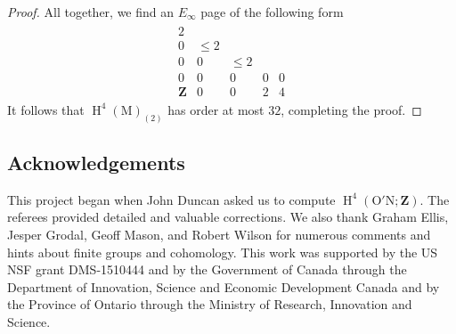 \documentclass[pdftex]{sigma}
\numberwithin{equation}{section}
\newcommand\bZ{\mathbf Z}
\newcommand\rM{\mathrm M}
\DeclareMathOperator\homology{H}
\renewcommand\H{\homology}
\newcommand\<\langle
\renewcommand\>\rangle
\begin{document}
\begin{proof}
 All together, we find an $E_\infty$ page of the following form
 \begin{gather*} \begin{array}{ccccc}
 2 \\
 0 & \leq 2 \\
 0 & 0 & \leq 2 \\
 0 & 0 & 0 & 0 & 0 \\
 \bZ & 0 & 0 & 2 & 4
 \end{array} \end{gather*}
 It follows that $\H^4(\rM)_{(2)}$ has order at most $32$, completing the proof.
\end{proof}

\subsection*{Acknowledgements}

This project began when John Duncan asked us to compute $\H^4(\mathrm{O'N};\bZ)$.
The referees provided detailed and valuable corrections.
We also thank Graham Ellis, Jesper Grodal, Geoff Mason, and Robert Wilson for numerous comments and hints about finite groups and cohomology.
This work was supported by the US NSF grant DMS-1510444 and by the Government of Canada through the Department of Innovation, Science and Economic Development Canada and by the Province of Ontario through the Ministry of Research, Innovation and Science.
\end{document}
